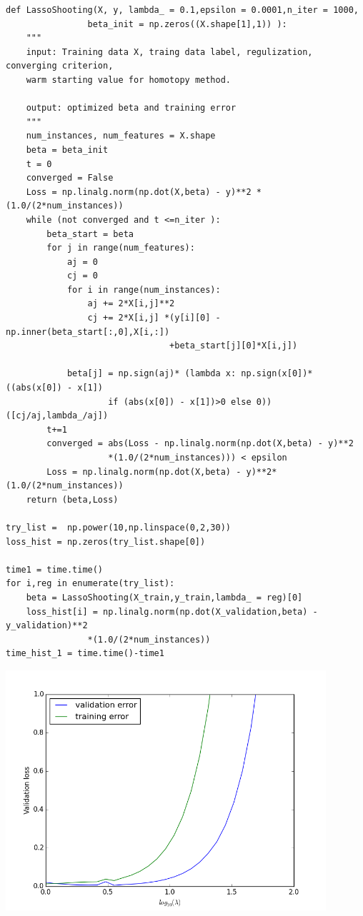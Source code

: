 \documentclass{article}
\begin{document}
\begin{verbatim}
def LassoShooting(X, y, lambda_ = 0.1,epsilon = 0.0001,n_iter = 1000,
				beta_init = np.zeros((X.shape[1],1)) ):
	"""
	input: Training data X, traing data label, regulization, converging criterion, 
	warm starting value for homotopy method.
	
	output: optimized beta and training error
	"""
	num_instances, num_features = X.shape      
	beta = beta_init
	t = 0
	converged = False
	Loss = np.linalg.norm(np.dot(X,beta) - y)**2 *(1.0/(2*num_instances))
	while (not converged and t <=n_iter ):
		beta_start = beta
		for j in range(num_features):
			aj = 0
			cj = 0
			for i in range(num_instances):
				aj += 2*X[i,j]**2
				cj += 2*X[i,j] *(y[i][0] - np.inner(beta_start[:,0],X[i,:])
								+beta_start[j][0]*X[i,j])
				
			beta[j] = np.sign(aj)* (lambda x: np.sign(x[0])* ((abs(x[0]) - x[1]) 
					if (abs(x[0]) - x[1])>0 else 0))([cj/aj,lambda_/aj])
		t+=1
		converged = abs(Loss - np.linalg.norm(np.dot(X,beta) - y)**2
					*(1.0/(2*num_instances))) < epsilon
		Loss = np.linalg.norm(np.dot(X,beta) - y)**2*(1.0/(2*num_instances))
	return (beta,Loss)

try_list =  np.power(10,np.linspace(0,2,30)) 
loss_hist = np.zeros(try_list.shape[0])

time1 = time.time()
for i,reg in enumerate(try_list):
	beta = LassoShooting(X_train,y_train,lambda_ = reg)[0]
	loss_hist[i] = np.linalg.norm(np.dot(X_validation,beta) - y_validation)**2
				*(1.0/(2*num_instances))
time_hist_1 = time.time()-time1 
\end{verbatim}
\begin{center}
\includegraphics[height = 3.5in]{2_1.png}
\end{center}
\end{document}
